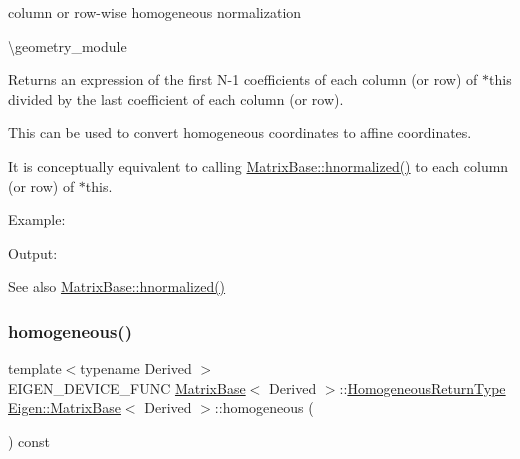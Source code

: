 column or row-\/wise homogeneous normalization 

\textbackslash{}geometry\+\_\+module

\begin{DoxyReturn}{Returns}
an expression of the first N-\/1 coefficients of each column (or row) of {\ttfamily $\ast$this} divided by the last coefficient of each column (or row).
\end{DoxyReturn}
This can be used to convert homogeneous coordinates to affine coordinates.

It is conceptually equivalent to calling \mbox{\hyperlink{group___geometry___module_gad7e913733107a9a1b61bff95ec9c03dd}{Matrix\+Base\+::hnormalized()}} to each column (or row) of {\ttfamily $\ast$this}.

Example\+: 
\begin{DoxyCodeInclude}{0}
\end{DoxyCodeInclude}
 Output\+: 
\begin{DoxyVerbInclude}
\end{DoxyVerbInclude}


\begin{DoxySeeAlso}{See also}
\mbox{\hyperlink{group___geometry___module_gad7e913733107a9a1b61bff95ec9c03dd}{Matrix\+Base\+::hnormalized()}} 
\end{DoxySeeAlso}
\mbox{\label{group___geometry___module_ga8cd24704519bf35e1724e1915d477a35}} 
\subsubsection{\texorpdfstring{homogeneous()}{homogeneous()}\hspace{0.1cm}{\footnotesize\ttfamily [1/2]}}
{\footnotesize\ttfamily template$<$typename Derived $>$ \\
E\+I\+G\+E\+N\+\_\+\+D\+E\+V\+I\+C\+E\+\_\+\+F\+U\+NC \mbox{\hyperlink{class_eigen_1_1_matrix_base}{Matrix\+Base}}$<$ Derived $>$\+::\mbox{\hyperlink{class_eigen_1_1_homogeneous}{Homogeneous\+Return\+Type}} \mbox{\hyperlink{class_eigen_1_1_matrix_base}{Eigen\+::\+Matrix\+Base}}$<$ Derived $>$\+::homogeneous (\begin{DoxyParamCaption}{ }\end{DoxyParamCaption}) const\hspace{0.3cm}{\ttfamily [inline]}}

